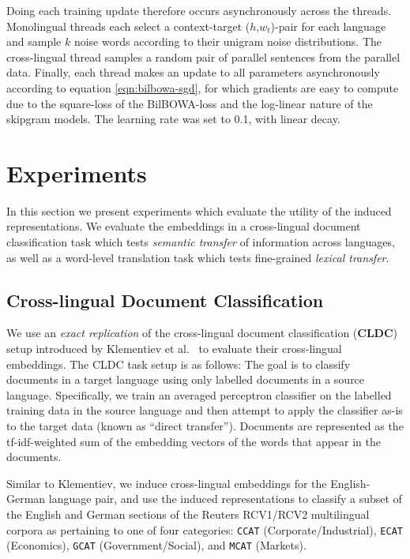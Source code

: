 \documentclass[10pt]{article}
\begin{document}
Doing each training update therefore occurs asynchronously across the threads.
Monolingual threads each select a context-target ($h$,$w_t$)-pair for each language 
and sample $k$ noise words according to their unigram noise distributions.  The cross-lingual
thread samples a random pair of parallel sentences from the parallel data. Finally, 
each thread makes an update to all parameters asynchronously according to equation 
\ref{eqn:bilbowa-sgd}, for which gradients are easy to compute due to the square-loss
of the BilBOWA-loss and the log-linear nature of the skipgram models.  The learning 
rate was set to 0.1, with linear decay.

\section{Experiments}
In this section we present experiments  which evaluate the utility of the
induced representations.  We evaluate the embeddings in a cross-lingual document 
classification task which tests \emph{semantic transfer} of information across languages,
as well as a word-level translation task which tests fine-grained \emph{lexical transfer}.

\subsection{Cross-lingual Document Classification}
\label{sec:cldc}

We use an \emph{exact replication} of the 
cross-lingual document classification (\textbf{CLDC}) setup introduced by Klementiev et
al.~\cite{klementiev2012} to evaluate their cross-lingual embeddings. The
CLDC task setup is as follows: The goal is to classify documents in a target
language using only labelled documents in a source language. Specifically,
we train an averaged perceptron classifier on the labelled training data in the 
source language and then attempt to apply the classifier as-is to the target data (known as
``direct transfer''). Documents are represented as the tf-idf-weighted
sum of the embedding vectors of the words that appear in the documents.

Similar to Klementiev, we induce cross-lingual
embeddings for the English-German language pair, and use the induced
representations to classify a subset of the English and German sections of
the Reuters  RCV1/RCV2 multilingual corpora \cite{lewis2004rcv1} as pertaining
to one of four categories: \texttt{CCAT} (Corporate/Industrial),
\texttt{ECAT} (Economics), \texttt{GCAT} (Government/Social), and
\texttt{MCAT} (Markets).
\end{document}
